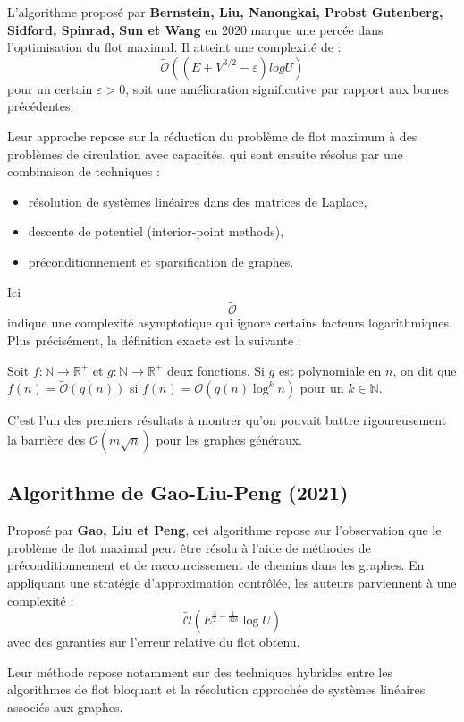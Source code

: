 \documentclass[a4paper]{article}
\begin{document}
L’algorithme proposé par \textbf{Bernstein, Liu, Nanongkai, Probst Gutenberg, Sidford, Spinrad, Sun et Wang} en 2020 marque une percée dans l’optimisation du flot maximal\cite{chen2022maximumflowminimumcostflow}. Il atteint une complexité de :
\[
\tilde{\mathcal{O}}((E+ V^{3/2} - \varepsilon)log U)
\]
pour un certain $\varepsilon > 0$, soit une amélioration significative par rapport aux bornes précédentes.

Leur approche repose sur la réduction du problème de flot maximum à des problèmes de circulation avec capacités, qui sont ensuite résolus par une combinaison de techniques :
\begin{itemize}
    \item résolution de systèmes linéaires dans des matrices de Laplace,
    \item descente de potentiel (interior-point methods),
    \item préconditionnement et sparsification de graphes.
\end{itemize}
Ici \[\tilde{\mathcal{O}}\] indique une complexité asymptotique qui ignore certains facteurs logarithmiques. Plus précisément, la définition exacte est la suivante :
\begin{definition} Soit $f: \mathbb{N} \to \mathbb{R}^+$ et $g: \mathbb{N} \to \mathbb{R}^+$ deux fonctions. Si $g$ est polynomiale en $n$, on dit que
	$f(n) = \tilde{\mathcal{O}}(g(n))$ si  $f(n) = \mathcal{O}(g(n) \log^k n)$ pour un $k \in \mathbb{N}$.
\end{definition}
C’est l’un des premiers résultats à montrer qu’on pouvait battre rigoureusement la barrière des $\mathcal{O}(m \sqrt{n})$ pour les graphes généraux.
\subsection{Algorithme de Gao-Liu-Peng (2021)}

Proposé par \textbf{Gao, Liu et Peng}, cet algorithme repose sur l’observation que le problème de flot maximal peut être résolu à l’aide de méthodes de préconditionnement et de raccourcissement de chemins dans les graphes\cite{barick2024effectspacetimegeometryneutrino}. En appliquant une stratégie d’approximation contrôlée, les auteurs parviennent à une complexité :
\[
\tilde{\mathcal{O}}\left(E^{\frac{3}{2} - \frac{1}{32\delta}} \log U\right)
\]
avec des garanties sur l’erreur relative du flot obtenu.

Leur méthode repose notamment sur des techniques hybrides entre les algorithmes de flot bloquant et la résolution approchée de systèmes linéaires associés aux graphes.
\end{document}
